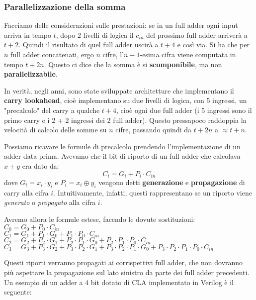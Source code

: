 \documentclass[a4paper,11pt]{article}
\begin{document}
\subsubsection{Parallelizzazione della somma}
Facciamo delle considerazioni sulle prestazioni: se in un full adder ogni input arriva in tempo $t$, dopo 2 livelli di logica il $c_{in}$ del prossimo full adder arriverà a $t + 2$.
Quindi il risultato di quel full adder uscirà a $t + 4$ e così via.
Si ha che per $n$ full adder concatenati, ergo $n$ cifre, l'$n-1$-esima cifra viene computata in tempo $t + 2n$.
Questo ci dice che la somma è si \textbf{scomponibile}, ma non \textbf{parallelizzabile}.

In verità, negli anni, sono state sviluppate architetture che implementano il \textbf{carry lookahead}, cioè implementano su due livelli di logica, con 5 ingressi, un "precalcolo" del carry a qualche $t + 4$, cioè ogni due full adder (i 5 ingressi sono il primo carry e i 2 + 2 ingressi dei 2 full adder).
Questo pressapoco raddoppia la velocità di calcolo delle somme su $n$ cifre, passando quindi da $t + 2n$ a $\approx t + n$.

Possiamo ricavare le formule di precalcolo prendendo l'implementazione di un adder data prima.
Avevamo che il bit di riporto di un full adder che calcolava $x + y$ era dato da:
$$
C_i = G_i + P_i \cdot C_{in}
$$
dove $G_i = x_i \cdot y_i$ e $P_i = x_i \oplus y_i$ vengono detti \textbf{generazione} e \textbf{propagazione} di carry alla cifra $i$. Intuitivamente, infatti, questi rappresentano se un riporto viene \textit{generato} o \textit{propagato} alla cifra $i$.

Avremo allora le formule estese, facendo le dovute sostituzioni: \\
\noindent
$
C_0 = G_0 + P_0 \cdot C_{in}
$ \\ 
$
C_1 = G_1 + P_1 \cdot G_0 + P_1 \cdot P_0 \cdot C_{in}
$ \\ 
$
C_2 = G_2 + P_2 \cdot G_1 + P_2 \cdot P_1 \cdot G_0 + P_2 \cdot P_1 \cdot P_0 \cdot C_{in}
$ \\ 
$
C_3 = G_3 + P_3 \cdot G_2 + P_3 \cdot P_2 \cdot G_1 + P_3 \cdot P_2 \cdot P_1 \cdot G_0 + P_3 \cdot P_2 \cdot P_1 \cdot P_0 \cdot C_{in}
$

\par\smallskip

Questi riporti verranno propagati ai corrispettivi full adder, che non dovranno più aspettare la propagazione sul lato sinistro da parte dei full adder precedenti.
Un esempio di un adder a 4 bit dotato di CLA implementato in Verilog è il seguente:
\end{document}
